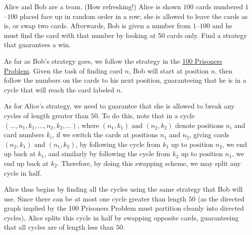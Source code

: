 \documentclass[10pt]{mypackage}
\begin{document}
\begin{problem}
  Alice and Bob are a team. (How refreshing!) Alice is shown $100$ cards numbered $1$--$100$ placed face up in random order in a row; she is allowed to leave the cards as is, or swap two cards. Afterwards, Bob is given a number from $1$--$100$ and he must find the card with that number by looking at 50 cards only. Find a strategy that guarantees a win.
\end{problem}
\begin{solution}
  As far as Bob's strategy goes, we follow the strategy in the \href{https://en.wikipedia.org/wiki/100_prisoners_problem}{100 Prisoners Problem}. Given the task of finding card $n$, Bob will start at position $n$, then follow the numbers on the cards to his next position, guaranteeing that he is in a cycle that will reach the card labeled $n$.\newline

  As for Alice's strategy, we need to guarantee that she is allowed to break any cycles of length greater than $50$. To do this, note that in a cycle $\left(\dots, n_1,k_1,\dots,n_2,k_2,\dots \right)$, where $\left( n_1,k_1 \right)$ and $\left( n_2,k_2 \right)$ denote positions $n_i$ and card numbers $k_i$, if we switch the cards at positions $n_1$ and $n_2$, giving cards $\left( n_2,k_1 \right)$ and $\left( n_1,k_2 \right)$, by following the cycle from $k_1$ up to position $n_2$, we end up back at $k_1$, and similarly by following the cycle from $k_2$ up to position $n_1$, we end up back at $k_2$. Therefore, by doing this swapping scheme, we may split any cycle in half.\newline

  Alice thus begins by finding all the cycles using the same strategy that Bob will use. Since there can be at most one cycle greater than length $50$ (as the directed graph implied by the 100 Prisoners Problem must partition cleanly into directed cycles), Alice splits this cycle in half by swapping opposite cards, guaranteeing that all cycles are of length less than $50$.
\end{solution}
\end{document}

